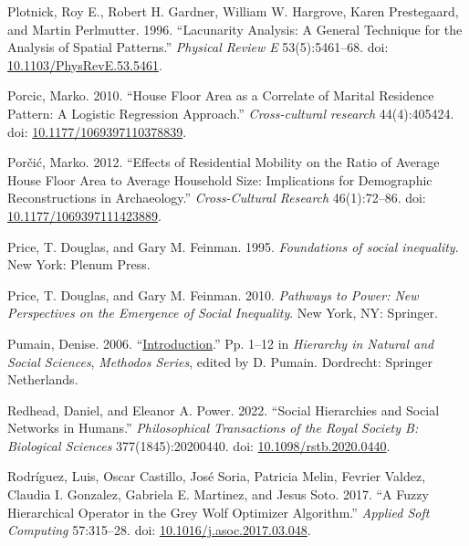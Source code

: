 \documentclass[
  12pt,
]{book}
\newlength{\cslhangindent}
\newlength{\cslentryspacingunit} %
\newenvironment{CSLReferences}[2] %
 {%
  \setlength{\parindent}{0pt}
  \ifodd #1
  \let\oldpar\par
  \def\par{\hangindent=\cslhangindent\oldpar}
  \fi
  \setlength{\parskip}{#2\cslentryspacingunit}
 }%
 {}
\begin{document}
\begin{CSLReferences}{1}{0}
\leavevmode{}%
Plotnick, Roy E., Robert H. Gardner, William W. Hargrove, Karen Prestegaard, and Martin Perlmutter. 1996. {``Lacunarity Analysis: A General Technique for the Analysis of Spatial Patterns.''} \emph{Physical Review E} 53(5):5461--68. doi: \href{https://doi.org/10.1103/PhysRevE.53.5461}{10.1103/PhysRevE.53.5461}.

\leavevmode{}%
Porcic, Marko. 2010. {``House Floor Area as a Correlate of Marital Residence Pattern: A Logistic Regression Approach.''} \emph{Cross-cultural research} 44(4):405424. doi: \href{https://doi.org/10.1177/1069397110378839}{10.1177/1069397110378839}.

\leavevmode{}%
Porčić, Marko. 2012. {``Effects of Residential Mobility on the Ratio of Average House Floor Area to Average Household Size: Implications for Demographic Reconstructions in Archaeology.''} \emph{Cross-Cultural Research} 46(1):72--86. doi: \href{https://doi.org/10.1177/1069397111423889}{10.1177/1069397111423889}.

\leavevmode{}%
Price, T. Douglas, and Gary M. Feinman. 1995. \emph{Foundations of social inequality}. New York: Plenum Press.

\leavevmode{}%
Price, T. Douglas, and Gary M. Feinman. 2010. \emph{Pathways to Power: New Perspectives on the Emergence of Social Inequality}. New York, NY: Springer.

\leavevmode{}%
Pumain, Denise. 2006. {``\href{https://doi.org/10.1007/1-4020-4127-6_1}{Introduction}.''} Pp. 1--12 in \emph{Hierarchy in {Natural} and {Social Sciences}}, \emph{Methodos {Series}}, edited by D. Pumain. {Dordrecht}: {Springer Netherlands}.

\leavevmode{}%
Redhead, Daniel, and Eleanor A. Power. 2022. {``Social Hierarchies and Social Networks in Humans.''} \emph{Philosophical Transactions of the Royal Society B: Biological Sciences} 377(1845):20200440. doi: \href{https://doi.org/10.1098/rstb.2020.0440}{10.1098/rstb.2020.0440}.

\leavevmode{}%
Rodríguez, Luis, Oscar Castillo, José Soria, Patricia Melin, Fevrier Valdez, Claudia I. Gonzalez, Gabriela E. Martinez, and Jesus Soto. 2017. {``A Fuzzy Hierarchical Operator in the Grey Wolf Optimizer Algorithm.''} \emph{Applied Soft Computing} 57:315--28. doi: \href{https://doi.org/10.1016/j.asoc.2017.03.048}{10.1016/j.asoc.2017.03.048}.


\end{CSLReferences}
\end{document}
